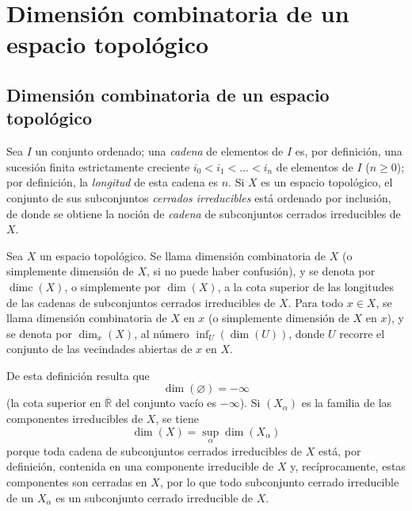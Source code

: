 
\setcounter{section}{13}
\section{Dimensión combinatoria de un espacio topológico}
\label{section:0.14-fr}

\setcounter{subsection}{0}
\subsection{Dimensión combinatoria de un espacio topológico}
\label{subsection:0.14.1-fr}

\begin{env}[14.1.1]
\label{0.14.1.1-fr}
Sea $I$ un conjunto ordenado; una \emph{cadena} de elementos de $I$ es, por
definición, una sucesión finita estrictamente creciente
$i_0<i_1<\ldots<i_n$ de elementos de $I$ ($n\geq 0$); por definición, la
\emph{longitud} de esta cadena es $n$. Si $X$ es un espacio topológico, el
conjunto de sus subconjuntos \emph{cerrados irreducibles} está ordenado por
inclusión, de donde se obtiene la noción de \emph{cadena} de subconjuntos
cerrados irreducibles de $X$.
\end{env}

\begin{definition}[14.1.2]
\label{0.14.1.2-fr}
Sea $X$ un espacio topológico. Se llama dimensión combinatoria de $X$
\textup{(o simplemente} dimensión de $X$\textup{, si no puede haber confusión)}, y se
denota por $\operatorname{dimc}(X)$, o simplemente por $\dim(X)$, a la cota superior de las
longitudes de las cadenas de subconjuntos cerrados irreducibles de $X$. Para
todo $x\in X$, se llama dimensión combinatoria de $X$ en $x$ \textup{(o
simplemente} dimensión de $X$ en $x$), y se denota por $\dim_x(X)$, al
número $\inf_U(\dim(U))$, donde $U$ recorre el conjunto de las vecindades
abiertas de $x$ en $X$.
\end{definition}

De esta definición resulta que
\[
  \dim(\varnothing)=-\infty
\]
(la cota superior en $\overline{\mathbb R}$ del conjunto vacío es $-\infty$).
Si $(X_\alpha)$ es la familia de las componentes irreducibles de $X$, se tiene
\[
  \dim(X)=\sup_\alpha\dim(X_\alpha)
  \tag{14.1.2.1}\label{0.14.1.2.1-fr}
\]
porque toda cadena de subconjuntos cerrados irreducibles de $X$ está, por
definición, contenida en una componente irreducible de $X$ y, recíprocamente,
estas componentes son cerradas en $X$, por lo que todo subconjunto cerrado
irreducible de un $X_\alpha$ es un subconjunto cerrado irreducible de $X$.


